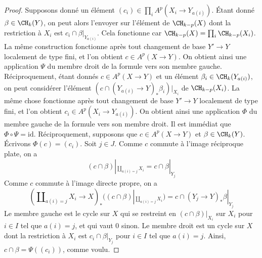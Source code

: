 \begin{proof}
Supposons donné un élément $(c_i) \in \prod_i A^p(X_i \to Y_{a(i)})$.
Étant donné $\beta \in \CH_k(Y)$, on peut alors l'envoyer sur l'élément de
$\CH_{k - p}(X)$ dont la restriction à $X_i$ est $c_i \cap \beta|_{Y_{a(i)}}$.
Cela fonctionne car $\CH_{k - p}(X) = \prod_i \CH_{k - p}(X_i)$.
La même construction fonctionne après tout changement de base $Y' \to Y$
localement de type fini, et l'on obtient $c \in A^p(X \to Y)$.
On obtient ainsi une application $\Psi$ du membre droit de la formule
vers son membre gauche.
Réciproquement, étant donnés $c \in A^p(X \to Y)$ et un élément
$\beta_i \in \CH_k(Y_{a(i)})$, on peut considérer l'élément
$(c \cap (Y_{a(i)} \to Y)_*\beta_i)|_{X_i}$ de $\CH_{k - p}(X_i)$.
La même chose fonctionne après tout changement de base $Y' \to Y$
localement de type fini, et l'on obtient $c_i \in A^p(X_i \to Y_{a(i)})$.
On obtient ainsi une application $\Phi$ du membre gauche
de la formule vers son membre droit.
Il est immédiat que $\Phi \circ \Psi = \text{id}$.
Réciproquement, supposons que $c \in A^p(X \to Y)$ et
$\beta \in \CH_k(Y)$. Écrivons $\Phi(c) = (c_i)$. Soit $j \in J$.
Comme $c$ commute à l'image réciproque plate, on a
$$
(c \cap \beta)|_{\coprod_{a(i) = j} X_i} =
c \cap \beta|_{Y_j}
$$
Comme $c$ commute à l'image directe propre, on a
$$
(\coprod\nolimits_{a(i) = j} X_i \to X)_*
((c \cap \beta)|_{\coprod_{a(i) = j} X_i})
=
c \cap (Y_j \to Y)_*\beta|_{Y_j}
$$
Le membre gauche est le cycle sur $X$ qui se restreint en $(c \cap \beta)|_{X_i}$
sur $X_i$ pour $i \in I$ tel que $a(i) = j$, et qui vaut $0$ sinon.
Le membre droit est un cycle sur $X$ dont la restriction à $X_i$
est $c_i \cap \beta|_{Y_j}$ pour $i \in I$ tel que $a(i) = j$.
Ainsi, $c \cap \beta = \Psi((c_i))$, comme voulu.
\end{proof}

